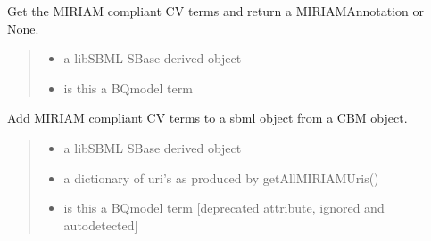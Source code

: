 \documentclass[letterpaper,12pt,english]{sphinxmanual}
\begin{document}
\begin{fulllineitems}
\label{\detokenize{api/io:cbmpy.CBXML.sbml_getCVterms}}
\pysigstartsignatures
\pysiglinewithargsret
{}
{\sphinxparamcomma {}}
{}
\pysigstopsignatures
\sphinxAtStartPar
Get the MIRIAM compliant CV terms and return a MIRIAMAnnotation or None.
\begin{quote}\begin{description}
\begin{itemize}
\item {} 
\sphinxAtStartPar
{} \textendash{} a libSBML SBase derived object

\item {} 
\sphinxAtStartPar
{} \textendash{} is this a BQmodel term

\end{itemize}

\end{description}\end{quote}

\end{fulllineitems}


\begin{fulllineitems}
\label{\detokenize{api/io:cbmpy.CBXML.sbml_setCVterms}}
\pysigstartsignatures
\pysiglinewithargsret
{}
{\sphinxparamcomma {}\sphinxparamcomma {}}
{}
\pysigstopsignatures
\sphinxAtStartPar
Add MIRIAM compliant CV terms to a sbml object from a CBM object.
\begin{quote}\begin{description}
\begin{itemize}
\item {} 
\sphinxAtStartPar
{} \textendash{} a libSBML SBase derived object

\item {} 
\sphinxAtStartPar
{} \textendash{} a dictionary of uri’s as produced by getAllMIRIAMUris()

\item {} 
\sphinxAtStartPar
{} \textendash{} is this a BQmodel term {[}deprecated attribute, ignored and autodetected{]}

\end{itemize}

\end{description}\end{quote}

\end{fulllineitems}
\end{document}
